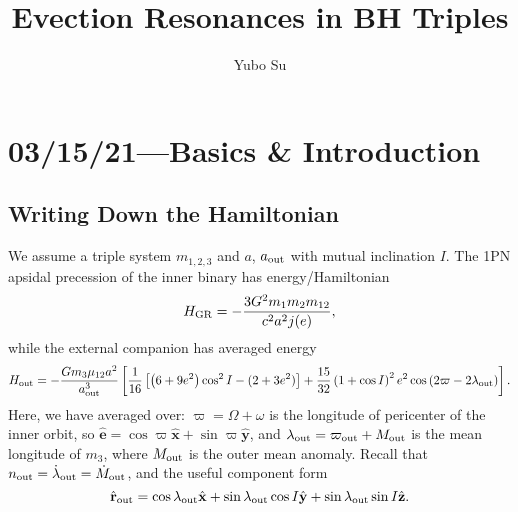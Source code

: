 \documentclass[11pt,
        usenames, %
        dvipsnames %
    ]{article}
\newcommand*{\bm}[1]{\boldsymbol{\mathbf{#1}}}
\newcommand*{\uv}[1]{\hat{\bm{#1}}}
\newcommand*{\p}[1]{\left(#1\right)}
\newcommand*{\s}[1]{\left[#1\right]}
\begin{document}
\onehalfspacing

\pagestyle{fancy}
\rhead{}
\cfoot{\thepage/\pageref{LastPage}}

\title{Evection Resonances in BH Triples}
\author{Yubo Su}
\date{}

\maketitle

\section{03/15/21---Basics \& Introduction}

\subsection{Writing Down the Hamiltonian}

We assume a triple system $m_{1,2,3}$ and $a$, $a_{\rm out}$ with mutual
inclination $I$. The 1PN apsidal precession of the inner binary has
energy/Hamiltonian
\begin{equation}
    H_{\rm GR} = -\frac{3G^2m_1m_2m_{12}}{c^2a^2j(e)},
\end{equation}
while the external companion has averaged energy
\begin{equation}
    H_{\rm out} = -\frac{Gm_3\mu_{12} a^2}{a_{\rm out}^3}\s{
        \frac{1}{16}\s{\p{6 + 9e^2}\cos^2 I
            - (2 + 3e^2)} + \frac{15}{32}
                \p{1 + \cos I}^2 e^2 \cos\p{2\varpi - 2\lambda_{\rm out}}}.
\end{equation}
Here, we have averaged over: $\varpi = \Omega + \omega$ is the longitude of
pericenter of the inner orbit, so $\uv{e} = \cos \varpi \uv{x} + \sin \varpi
\uv{y}$, and $\lambda_{\rm out} = \varpi_{\rm out} + M_{\rm out}$ is the mean
longitude of $m_3$, where $M_{\rm out}$ is the outer mean anomaly. Recall that
$n_{\rm out} = \dot{\lambda}_{\rm out} = \dot{M}_{\rm out}$, and the useful
component form
\begin{equation}
    \uv{r}_{\rm out} = \cos \lambda_{\rm out}\uv{x}
        + \sin \lambda_{\rm out} \cos I \uv{y}
        + \sin \lambda_{\rm out} \sin I \uv{z}.
\end{equation}
\end{document}
